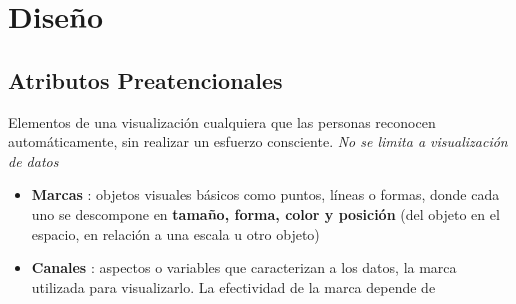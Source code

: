 
\section{Diseño}
\subsection{Atributos Preatencionales}
Elementos de una visualización cualquiera que las personas reconocen automáticamente, sin realizar un esfuerzo consciente. \textit{No se limita a visualización de datos}
\begin{itemize}
    \item {\textbf{Marcas} : objetos visuales básicos como puntos, líneas o formas, donde cada uno se descompone en \textbf{tamaño, forma, color y posición} (del objeto en el espacio, en relación a una escala u otro objeto)}
    \item {\textbf{Canales} : aspectos o variables que caracterizan a los datos, la marca utilizada para visualizarlo. La efectividad de la marca depende de
    }
\end{itemize}


